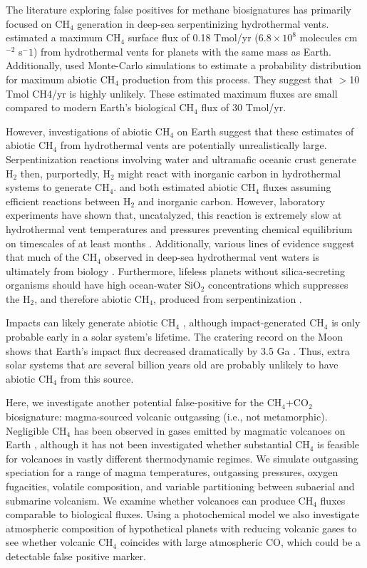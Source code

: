 The literature exploring false positives for methane biosignatures has primarily focused on CH$_4$ generation in deep-sea serpentinizing hydrothermal vents. \citet{Guzman-Marmolejo_2013} estimated a maximum CH$_4$ surface flux of 0.18 Tmol/yr ($6.8\times10^8$ molecules cm$^{-2}$ s$^-1$) from hydrothermal vents for planets with the same mass as Earth. Additionally, \citet{KrissansenTotton_2018_diseq} used Monte-Carlo simulations to estimate a probability distribution for maximum abiotic CH$_4$ production from this process. They suggest that $>$10 Tmol CH4/yr is highly unlikely. These estimated maximum fluxes are small compared to modern Earth's biological CH$_4$ flux of 30 Tmol/yr. 

However, investigations of abiotic CH$_4$ on Earth suggest that these estimates of abiotic CH$_4$ from hydrothermal vents are potentially unrealistically large. Serpentinization reactions involving water and ultramafic oceanic crust generate H$_2$ then, purportedly, H$_2$ might react with inorganic carbon in hydrothermal systems to generate CH$_4$. \citet{KrissansenTotton_2018_diseq} and \citet{Guzman-Marmolejo_2013} both estimated abiotic CH$_4$ fluxes assuming efficient reactions between H$_2$ and inorganic carbon. However, laboratory experiments have shown that, uncatalyzed, this reaction is extremely slow at hydrothermal vent temperatures and pressures preventing chemical equilibrium on timescales of at least months \citep{Reeves_2020}. Additionally, various lines of evidence suggest that much of the CH$_4$ observed in deep-sea hydrothermal vent waters is ultimately from biology \citep{Reeves_2020}. Furthermore, lifeless planets without silica-secreting organisms should have high ocean-water SiO$_2$ concentrations which suppresses the H$_2$, and therefore abiotic CH$_4$, produced from serpentinization \citep{Tutolo_2020}.

Impacts can likely generate abiotic CH$_4$ \citep{Zahnle_2020}, although impact-generated CH$_4$ is only probable early in a solar system's lifetime. The cratering record on the Moon shows that Earth's impact flux decreased dramatically by 3.5 Ga \citep{Marchi_2014}. Thus, extra solar systems that are several billion years old are probably unlikely to have abiotic CH$_4$ from this source.

Here, we investigate another potential false-positive for the CH$_4$+CO$_2$ biosignature: magma-sourced volcanic outgassing (i.e., not metamorphic). Negligible CH$_4$ has been observed in gases emitted by magmatic volcanoes on Earth \citep{Reeves_2020,Catling_2017}, although it has not been investigated whether substantial CH$_4$ is feasible for volcanoes in vastly different thermodynamic regimes. We simulate outgassing speciation for a range of magma temperatures, outgassing pressures, oxygen fugacities, volatile composition, and variable partitioning between subaerial and submarine volcanism. We examine whether volcanoes can produce CH$_4$ fluxes comparable to biological fluxes. Using a photochemical model we also investigate atmospheric composition of hypothetical planets with reducing volcanic gases to see whether volcanic CH$_4$ coincides with large atmospheric CO, which could be a detectable false positive marker. 

